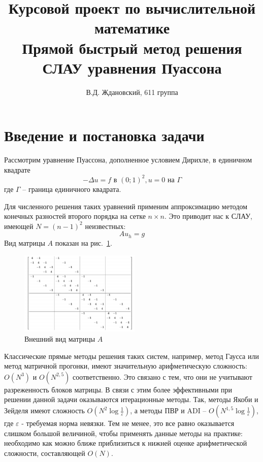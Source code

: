 \documentclass[a4paper]{article}
\title{Курсовой проект по вычислительной математике\\Прямой быстрый метод решения СЛАУ уравнения Пуассона}
\author{В.Д. Ждановский, 611 группа}
\begin{document}
	\maketitle
	
	\section{Введение и постановка задачи}
		Рассмотрим уравнение Пуассона, дополненное условием Дирихле, в единичном квадрате
		\begin{equation}
		-\Delta u = f \text{ в } (0;1)^2, u=0 \text{ на } \Gamma
		\end{equation}
		где $\Gamma$ -- граница единичного квадрата.
		 
		Для численного решения таких уравнений применим аппроксимацию методом конечных разностей второго порядка на сетке $n \times n$. Это приводит нас к СЛАУ, имеющей $N=(n-1)^2$ неизвестных:
		\begin{equation}
		Au_h = g
		\end{equation}
		Вид матрицы $A$ показан на рис.~\ref{fig:matrix}.
		\begin{figure}[h!]
			\centering
			\includegraphics[height=40mm]{matrix.png}
			\caption{Внешний вид матрицы $A$\label{fig:matrix}}
		\end{figure}
		
		Классические прямые методы решения таких систем, например, метод Гаусса или метод матричной прогонки, имеют значительную арифметическую сложность: $O(N^3)$ и $O(N^{2,5})$ соответственно. Это связано с тем, что они не учитывают разреженность блоков матрицы. В связи с этим более эффективными при решении данной задачи оказываются итерационные методы. Так, методы Якоби и Зейделя имеют сложность $O(N^2 \log\frac{1}{\varepsilon})$, а методы ПВР и ADI -- $O(N^{1,5} \log\frac{1}{\varepsilon})$, где $\varepsilon$ - требуемая норма невязки. Тем не менее, это все равно оказывается слишком большой величиной, чтобы применять данные методы на практике: необходимо как можно ближе приблизиться к нижней оценке арифметической сложности, составляющей $O(N)$.
\end{document}
